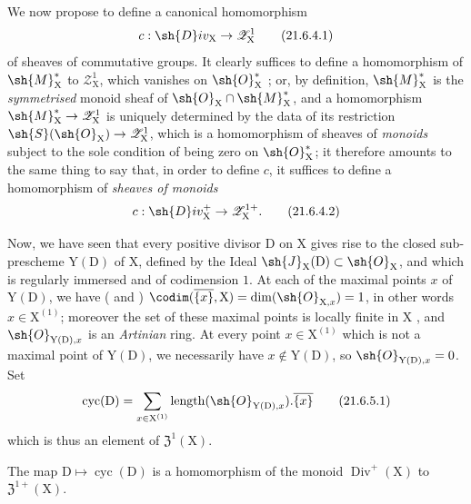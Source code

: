 \begin{env}[21.6.4]
\label{IV.21.6.4}
We now propose to define a canonical homomorphism
\[
\label{IV.21.6.4.1}
  c:\sh{D}iv_\mathrm{X}\to\mathscr{Z}_\mathrm{X}^1
  \tag{21.6.4.1}
\]
of sheaves of commutative groups.
It clearly suffices to define a homomorphism of $\sh{M}_\mathrm{X}^*$ to $\mathscr{Z}_\mathrm{X}^1$, which vanishes on $\sh{O}_\mathrm{X}^*$ ;
or, by definition, $\sh{M}_\mathrm{X}^*$ is the \emph{symmetrised} monoid sheaf of $\sh{O}_\mathrm{X}\cap\sh{M}_\mathrm{X}^*$, and a homomorphism $\sh{M}_\mathrm{X}^*\to\mathscr{Z}_\mathrm{X}^1$ is uniquely determined by the data of its restriction $\sh{S}(\sh{O}_\mathrm{X})\to\mathscr{Z}_\mathrm{X}^1$, which is a homomorphism of sheaves of \emph{monoids} subject to the sole condition of being zero on $\sh{O}_\mathrm{X}^*$;
it therefore amounts to the same thing to say that, in order to define $c$, it suffices to define a homomorphism of \emph{sheaves of monoids}
\[
\label{IV.21.6.4.2}
  c:\sh{D}iv_\mathrm{X}^+\to\mathscr{Z}_\mathrm{X}^{1+}.
  \tag{21.6.4.2}
\]
\end{env}

\begin{env}[21.6.5]
\label{IV.21.6.5}
Now, we have seen that every positive divisor $\mathrm{D}$ on $\mathrm{X}$ gives rise to the closed sub-prescheme $\mathrm{Y}(\mathrm{D})$ of $\mathrm{X}$, defined by the Ideal $\sh{J}_\mathrm{X}(\mathrm{D})\subset\sh{O}_\mathrm{X}$, and which is regularly immersed and of codimension $1$.
At each of the maximal points $x$ of $\mathrm{Y}(\mathrm{D})$, we have ( and ) $\codim(\overline{\{x\}},\mathrm{X})=\dim(\sh{O}_{\mathrm{X},x})=1$, in other words $x\in\mathrm{X}^{(1)}$;
moreover the set of these maximal points is locally finite in $\mathrm{X}$ , and $\sh{O}_{\mathrm{Y}(\mathrm{D}),x}$ is an \emph{Artinian} ring.
At every point $x\in\mathrm{X}^{(1)}$ which is not a maximal point of $\mathrm{Y}(\mathrm{D})$, we necessarily have $x\notin\mathrm{Y}(\mathrm{D})$, so $\sh{O}_{\mathrm{Y}(\mathrm{D}),x}=0$.
Set
\[
\label{IV.21.6.5.1}
  \operatorname{cyc}(\mathrm{D})=\sum_{x\in\mathrm{X}^{(1)}}\operatorname{length}(\sh{O}_{\mathrm{Y}(\mathrm{D}),x}).\overline{\{x\}}
  \tag{21.6.5.1}
\]
which is thus an element of $\mathfrak{Z}^1(\mathrm{X})$.
\end{env}

\begin{proposition}[21.6.6]
\label{IV.21.6.6}
The map $\mathrm{D}\mapsto\operatorname{cyc}(\mathrm{D})$ is a homomorphism of the monoid $\operatorname{Div}^+(\mathrm{X})$ to $\mathfrak{Z}^{1+}(\mathrm{X})$.
\end{proposition}

